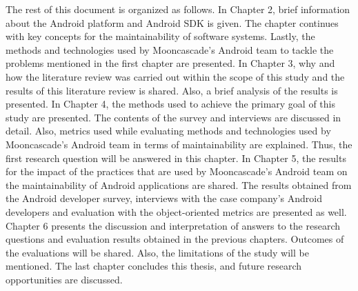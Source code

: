 The rest of this document is organized as follows. In Chapter 2, brief information about the Android platform and Android SDK is given. The chapter continues with key concepts for the maintainability of software systems. Lastly, the methods and technologies used by Mooncascade's Android team to tackle the problems mentioned in the first chapter are presented. In Chapter 3, why and how the literature review was carried out within the scope of this study and the results of this literature review is shared. Also, a brief analysis of the results is presented. In Chapter 4, the methods used to achieve the primary goal of this study are presented. The contents of the survey and interviews are discussed in detail. Also, metrics used while evaluating methods and technologies used by Mooncascade's Android team in terms of maintainability are explained. Thus, the first research question will be answered in this chapter. In Chapter 5, the results for the impact of the practices that are used by Mooncascade's Android team on the maintainability of Android applications are shared. The results obtained from the Android developer survey, interviews with the case company's Android developers and evaluation with the object-oriented metrics are presented as well. Chapter 6 presents the discussion and interpretation of answers to the research questions and evaluation results obtained in the previous chapters. Outcomes of the evaluations will be shared. Also, the limitations of the study will be mentioned. The last chapter concludes this thesis, and future research opportunities are discussed.

